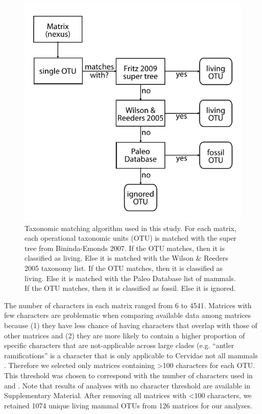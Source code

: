 \begin{figure}[!htbp]
\centering
    \includegraphics[width=1\textwidth]{Missing_mammals/Figures/Supp_figure_Taxonomic_algorithm.pdf}
\caption{Taxonomic matching algorithm used in this study. For each matrix, each operational taxonomic units (OTU) is matched with the super tree from Bininda-Emonds 2007. If the OTU matches, then it is classified as living. Else it is matched with the Wilson \& Reeders 2005 taxonomy list. If the OTU matches, then it is classified as living. Else it is matched with the Paleo Database list of mammals. If the OTU matches, then it is classified as fossil. Else it is ignored.}
\label{Supp_figure_Taxonomic_algorithm}
\end{figure}

The number of characters in each matrix ranged from 6 to 4541.
Matrices with few characters are problematic when comparing available data among matrices because (1) they have less chance of having characters that overlap with those of other matrices \citep{wagner2000} and (2) they are more likely to contain a higher proportion of specific characters that are not-applicable across large clades (e.g. ``antler ramifications'' is a character that is only applicable to Cervidae not all mammals \citep{Brazeau2011}.
Therefore we selected only matrices containing \textgreater 100 characters for each OTU.
This threshold was chosen to correspond with the number of characters used in \citep{GuillermeCooper} and \citep{harrisonamong-character2014}.
Note that results of analyses with no character threshold are available in Supplementary Material. 
After removing all matrices with \textless 100 characters, we retained 1074 unique living mammal OTUs from 126 matrices for our analyses. %


